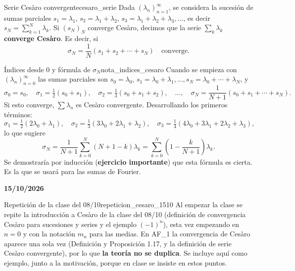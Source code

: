 \begin{definicion}{Serie Cesàro convergente}{cesaro_serie}
Dada $(\lambda_n)_{n=1}^\infty$, se considera la sucesión de sumas parciales $s_1 = \lambda_1$, $s_2 = \lambda_1 + \lambda_2$, $s_3 = \lambda_1+\lambda_2+\lambda_3, \dots$, es decir $s_N = \sum_{k=1}^N \lambda_k$. Si $(s_N)_N$ converge Cesàro, decimos que la serie $\sum_k \lambda_k$ \textbf{converge Cesàro}. Es decir, si
\[
\sigma_N = \frac{1}{N}\left( s_1 + s_2 + \cdots + s_N \right) \quad \text{converge.}
\]
\end{definicion}

\begin{nota}{Índices desde 0 y fórmula de $\sigma_N$}{nota_indices_cesaro}
Cuando se empieza con $(\lambda_n)_{n=0}^\infty$ las sumas parciales son $s_0 = \lambda_0$, $s_1 = \lambda_0+\lambda_1, \dots, s_N = \lambda_0 + \cdots + \lambda_N$, y
\[
\sigma_0 = s_0, \quad \sigma_1 = \tfrac{1}{2}(s_0 + s_1), \quad \sigma_2 = \tfrac{1}{3}(s_0+s_1+s_2), \quad \dots, \quad \sigma_N = \frac{1}{N+1}(s_0 + s_1 + \cdots + s_N).
\]
Si esto converge, $\sum \lambda_n$ es Cesàro convergente. Desarrollando los primeros términos:
\[
\sigma_1 = \tfrac{1}{2}(2\lambda_0 + \lambda_1), \quad \sigma_2 = \tfrac{1}{3}(3\lambda_0 + 2\lambda_1 + \lambda_2), \quad \sigma_3 = \tfrac{1}{4}(4\lambda_0 + 3\lambda_1 + 2\lambda_2 + \lambda_3),
\]
lo que sugiere
\[
\sigma_N = \frac{1}{N+1} \sum_{k=0}^N (N+1-k)\lambda_k = \sum_{k=0}^N \left(1 - \frac{k}{N+1}\right) \lambda_k.
\]
Se demostraría por inducción (\textbf{ejercicio importante}) que esta fórmula es cierta. Es la que se usará para las sumas de Fourier.
\end{nota}

\textbf{15/10/2026}

\begin{nota}{Repetición de la clase del 08/10}{repeticion_cesaro_1510}
Al empezar la clase se repite la introducción a Cesàro de la clase del 08/10 (definición de convergencia Cesàro para sucesiones y series y el ejemplo $(-1)^n$), esta vez empezando en $n=0$ y con la notación $m_n$ para las medias. En AF\_1 la convergencia de Cesàro aparece una sola vez (Definición y Proposición 1.17, y la definición de serie Cesàro convergente), por lo que \textbf{la teoría no se duplica}. Se incluye aquí como ejemplo, junto a la motivación, porque en clase se insiste en estos puntos.
\end{nota}

